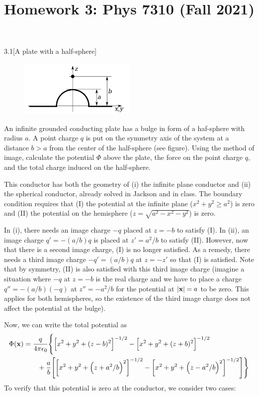 \documentclass[12pt]{article}
\title{Homework 3: Phys 7310 (Fall 2021)}
\begin{document}
\maketitle

\begin{problem}{3.1}[A plate with a half-sphere]~\\
    \begin{figure}[h]
        \centering
        \includegraphics[width=0.5\textwidth]{hw3_p1.jpg}
    \end{figure}
An infinite grounded conducting plate has a bulge in form of a haf-sphere with
radius $a$. A point charge $q$ is put on the symmetry axis of the system at a
distance $b>a$ from the center of the half-sphere (see figure). Using the method
of image, calculate the potential $\Phi$ above the plate, the force on the point
charge $q$, and the total charge induced on the half-sphere.
\begin{solution}
This conductor has both the geometry of (i) the infinite plane conductor 
and (ii) the spherical conductor, already solved in Jackson and in class.
The boundary condition requires that (I) the potential at the infinite plane
($x^2+y^2\geq a^2$) is zero and (II) the potential on the hemisphere
($z=\sqrt{a^2-x^2-y^2}$) is zero.

In (i), there needs an image charge $-q$ placed at $z=-b$ to satisfy (I). In
(ii), an image charge $q'=-(a/b)q$ is placed at $z'=a^2/b$ to satisfy (II).
However, now that there is a second image charge, (I) is no longer satisfied. As
a remedy, there needs a third image charge $-q'=(a/b)q$ at $z=-z'$ so that (I) 
is satisfied. Note that by symmetry, (II) is also satisfied with this third 
image charge (imagine a situation where $-q$ at $z=-b$ is the real charge and 
we have to place a charge $q''=-(a/b)(-q)$ at $z''=-a^2/b$ for the potential at
$\abs{\vb{x}}=a$ to be zero. This applies for both hemispheres, so the
existence of the third image charge does not affect the potential at the bulge).

Now, we can write the total potential as
\begin{align}\label{p1:Phi_cartesian}
    \Phi(\vb{x})
    &=\frac{q}{4\pi\epsilon_0}\Bigg\{
        \qty[x^2+y^2+(z-b)^2]^{-1/2}-\qty[x^2+y^2+(z+b)^2]^{-1/2}\notag\\
    &\qquad+\frac{a}{b}\qty[
            \qty[x^2+y^2+\qty(z+a^2/b)^2]^{-1/2}
            -\qty[x^2+y^2+\qty(z-a^2/b)^2]^{-1/2}
        ]
    \Bigg\}
\end{align}
To verify that this potential is zero at the conductor, we consider two cases:


\end{solution}
\end{problem}
\end{document}
